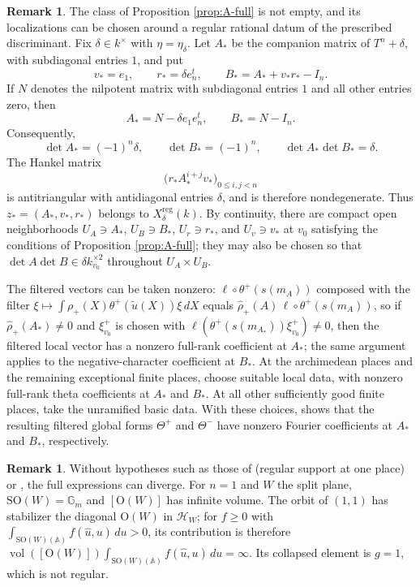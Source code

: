 \documentclass[11pt,oneside,notitlepage]{book}
\numberwithin{equation}{section}
\theoremstyle{plain}
\theoremstyle{definition}
\newtheorem{remark}[theorem]{Remark}
\newcommand{\A}{\mathbb{A}}
\newcommand{\SO}{\mathrm{SO}}
\newcommand{\Ort}{\mathrm{O}}
\newcommand{\vol}{\operatorname{vol}}
\begin{document}
\begin{remark}\label{rem:A-full-nonempty}
	The class of Proposition \ref{prop:A-full} is not empty, and its localizations can be chosen around a regular rational datum of the prescribed discriminant. Fix \(\delta\in k^\times\) with \(\eta=\eta_\delta\). Let \(A_*\) be the companion matrix of \(T^n+\delta\), with subdiagonal entries \(1\), and put
	\[
	v_*=e_1,\qquad
	r_*=\delta e_n^t,\qquad
	B_*=A_*+v_*r_*-I_n.
	\]
	If \(N\) denotes the nilpotent matrix with subdiagonal entries \(1\) and all other entries zero, then
	\[
	A_*=N-\delta e_1e_n^t,\qquad B_*=N-I_n.
	\]
	Consequently,
	\[
	\det A_*=(-1)^n\delta,\qquad
	\det B_*=(-1)^n,\qquad
	\det A_*\det B_*=\delta.
	\]
	The Hankel matrix
	\[
	\bigl(r_*A_*^{i+j}v_*\bigr)_{0\leq i,j<n}
	\]
	is antitriangular with antidiagonal entries \(\delta\), and is therefore nondegenerate. Thus \(z_*=(A_*,v_*,r_*)\) belongs to \(X_\delta^{\mathrm{reg}}(k)\). By continuity, there are compact open neighborhoods \(U_A\ni A_*\), \(U_B\ni B_*\), \(U_r\ni r_*\), and \(U_v\ni v_*\) at \(v_0\) satisfying the conditions of Proposition \ref{prop:A-full}; they may also be chosen so that \(\det A\det B\in\delta k_{v_0}^{\times2}\) throughout \(U_A\times U_B\).	
	
	
	
	
	The filtered vectors can be taken nonzero: $\ell\circ\theta^+(s(m_A))$ composed with the filter $\xi\mapsto\int\rho_+(X)\theta^+(\tilde u(X))\xi\,dX$ equals $\widehat\rho_+(A)\,\ell\circ\theta^+(s(m_A))$, so if $\widehat\rho_+(A_*)\ne0$ and $\xi^+_{v_0}$ is chosen with $\ell(\theta^+(s(m_{A_*}))\xi^+_{v_0})\ne0$, then the filtered local vector has a nonzero full-rank coefficient at $A_*$; the same argument applies to the negative-character coefficient at $B_*$. At the archimedean places and the remaining exceptional finite places, choose suitable local data, with nonzero full-rank theta coefficients at \(A_*\) and \(B_*\). At all other sufficiently good finite places, take the unramified basic data. With these choices,  shows that the resulting
	filtered global forms $\Theta^+$ and $\Theta^-$ have nonzero
	Fourier coefficients at $A_*$ and $B_*$, respectively. 
\end{remark}

\begin{remark}\label{rem:divergence}
Without hypotheses such as those of  (regular support at one place) or , the full expressions can diverge. For $n=1$ and $W$ the split plane, $\SO(W)=\mathbb G_m$ and $[\Ort(W)]$ has infinite volume. The orbit of $(1,1)$ has stabilizer the diagonal $\Ort(W)$ in $\mathcal H_W$; for $f\ge0$ with $\int_{\SO(W)(\A)}f(\widehat u,u)\,du>0$, its contribution is therefore $\vol([\Ort(W)])\int_{\SO(W)(\A)}f(\widehat u,u)\,du=\infty$. Its collapsed element is $g=1$, which is not regular.
\end{remark}
\end{document}
